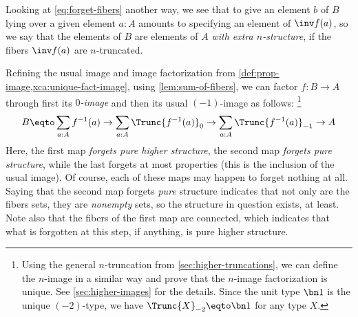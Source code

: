 Looking at \eqref{eq:forget-fibers} another way,
we see that to give an element $b$ of $B$ lying
over a given element $a:A$ amounts to
specifying an element of $\inv f(a)$,
so we say that the elements of $B$
are elements of $A$ \emph{with extra $n$-structure},
if the fibers $\inv f(a)$ are $n$-truncated.

Refining the usual image and image factorization from
\cref{def:prop-image,xca:unique-fact-image},
using \cref{lem:sum-of-fibers},
we can factor $f : B \to A$ through
first its \emph{$0$-image}
and then its usual $(-1)$-image as follows:%
\footnote{Using the general $n$-truncation
  from \cref{sec:higher-truncations},
  we can define the $n$-image
  in a similar way and prove that
  the $n$-image factorization is unique.
  See \cref{sec:higher-images} for the details.
  Since the unit type $\bn 1$ is the unique $(-2)$-type,
  we have $\Trunc{X}_{-2} \eqto \bn 1$ for any type $X$.}
\[
  B \eqto \sum_{a:A} f^{-1}(a) \to
  \sum_{a:A} \Trunc{f^{-1}(a)}_0 \to
  \sum_{a:A} \Trunc{f^{-1}(a)}_{-1} \to A
\]
Here, the first map \emph{forgets pure higher structure},
the second map \emph{forgets pure structure},
while the last forgets at most properties
(this is the inclusion of the usual image).
Of course, each of these maps may happen to forget nothing at all.
Saying that the second map forgets \emph{pure} structure
indicates that not only are the fibers sets,
they are \emph{nonempty} sets,
so the structure in question exists, at least.
Note also that the fibers of the first map are connected,
which indicates that what is forgotten at this step, if anything,
is pure higher structure.

